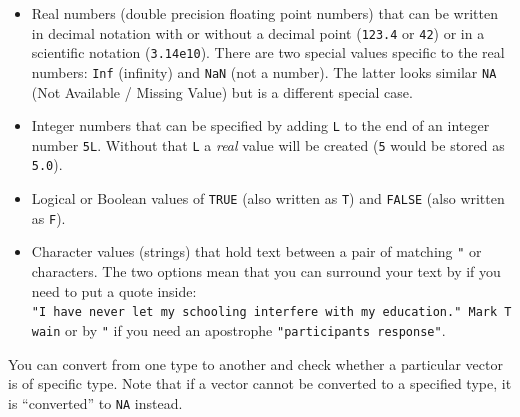 \documentclass[
]{book}
\providecommand{\tightlist}{%
  \setlength{\itemsep}{0pt}\setlength{\parskip}{0pt}}
\begin{document}
\begin{itemize}
\tightlist
\item
  Real numbers (double precision floating point numbers) that can be written in decimal notation with or without a decimal point (\texttt{123.4} or \texttt{42}) or in a scientific notation (\texttt{3.14e10}). There are two special values specific to the real numbers: \texttt{Inf} (infinity) and \texttt{NaN} (not a number). The latter looks similar \texttt{NA} (Not Available / Missing Value) but is a different special case.
\item
  Integer numbers that can be specified by adding \texttt{L} to the end of an integer number \texttt{5L}. Without that \texttt{L} a \emph{real} value will be created (\texttt{5} would be stored as \texttt{5.0}).
\item
  Logical or Boolean values of \texttt{TRUE} (also written as \texttt{T}) and \texttt{FALSE} (also written as \texttt{F}).
\item
  Character values (strings) that hold text between a pair of matching \texttt{"} or \texttt{\textquotesingle{}} characters. The two options mean that you can surround your text by \texttt{\textquotesingle{}} if you need to put a quote inside: \texttt{\textquotesingle{}"I\ have\ never\ let\ my\ schooling\ interfere\ with\ my\ education."\ Mark\ Twain\textquotesingle{}} or by \texttt{"} if you need an apostrophe \texttt{"participant\textquotesingle{}s\ response"}.
\end{itemize}

You can convert from one type to another and check whether a particular vector is of specific type. Note that if a vector cannot be converted to a specified type, it is ``converted'' to \texttt{NA} instead.
\end{document}
